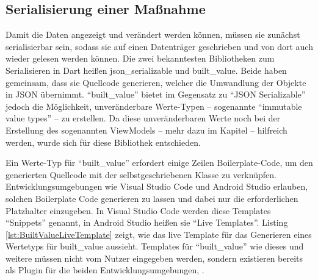 
\clearpage
\subsection{Serialisierung einer Maßnahme}

Damit die Daten angezeigt und verändert werden können, müssen sie zunächst serialisierbar sein, sodass sie auf einen Datenträger geschrieben und von dort auch wieder gelesen werden können.
Die zwei bekanntesten Bibliotheken zum Serialisieren in Dart heißen json_serializable und built_value.
Beide haben gemeinsam, dass sie Quellcode generieren, welcher die Umwandlung der Objekte in JSON übernimmt.
\enquote{built_value} bietet im Gegensatz zu \enquote{JSON Serializable} jedoch die Möglichkeit, unveränderbare Werte-Typen -- sogenannte \enquote{immutable value types} -- zu erstellen.
Da diese unveränderbaren Werte noch bei der Erstellung des sogenannten ViewModels --  mehr dazu im Kapitel  -- hilfreich werden, wurde sich für diese Bibliothek entschieden.

Ein Werte-Typ für \enquote{built_value} erfordert einige Zeilen Boilerplate-Code, um den generierten Quellcode mit der selbstgeschriebenen Klasse zu verknüpfen.
Entwicklungsumgebungen wie Visual Studio Code und Android Studio erlauben, solchen Boilerplate Code generieren zu lassen und dabei nur die erforderlichen Platzhalter einzugeben.
In Visual Studio Code werden diese Templates \enquote{Snippets} genannt, in Android Studio heißen sie \enquote{Live Templates}.
 Listing \ref{lst:BuiltValueLiveTemplate} zeigt, wie das live Template für das Generieren eines Wertetyps  für built_value aussieht.
Templates für \enquote{built_value} wie dieses und weitere müssen nicht vom Nutzer eingegeben werden, sondern existieren bereits als Plugin für die beiden Entwicklungsumgebungen, .


